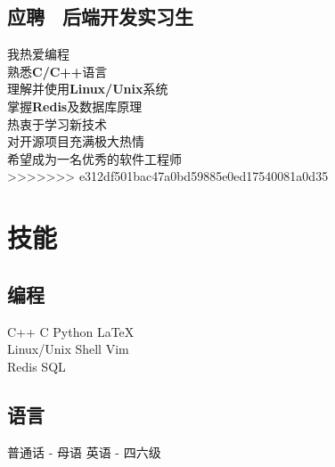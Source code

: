 \documentclass[]{deedy-resume-openfont}
\begin{document}
\begin{minipage}[t]{0.25\textwidth}
\subsection{应聘 \  后端开发实习生}
我热爱编程 \\
熟悉\textbf{C/C++}语言 \\
理解并使用\textbf{Linux/Unix}系统 \\
掌握\textbf{Redis}及数据库原理 \\
热衷于学习新技术 \\
对开源项目充满极大热情 \\
希望成为一名优秀的软件工程师 \\
>>>>>>> e312df501bac47a0bd59885e0ed17540081a0d35
\sectionsep


\section{技能}
\sectionsep
\subsection{编程}
C++ \textbullet{} C \textbullet{} Python \textbullet{} \LaTeX \\
Linux/Unix \textbullet{} Shell \textbullet{} Vim \\
Redis \textbullet{} SQL \\ 
\sectionsep

\subsection{语言}
普通话 - 母语 \textbullet{} 英语 - 四六级\\
\sectionsep

%
%

\end{minipage} 
\hfill
\end{document}
